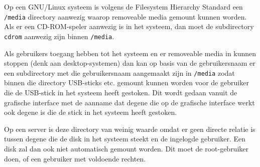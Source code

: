 Op een GNU/Linux systeem is volgens de Filesystem Hierarchy Standard een \texttt{/media} directory aanwezig waarop removeable media gemount kunnen worden. Als er een CD-ROM-speler aanwezig is in het systeem, dan moet de subdirectory \texttt{cdrom} aanwezig zijn binnen \texttt{/media}.

Als gebruikers toegang hebben tot het systeem en er removeable media in kunnen stoppen (denk aan desktop-systemen) dan kan op basis van de gebruikersnaam er een subdirectory met die gebruikersnaam aangemaakt zijn in \texttt{/media} zodat binnen die directory USB-sticks etc. gemount kunnen worden voor de gebruiker die de USB-stick in het systeem heeft gestoken. Dit wordt gedaan vanuit de grafische interface met de aanname dat degene die op de grafische interface werkt ook degene is die de stick in het systeem heeft gestoken.

Op een server is deze directory van weinig waarde omdat er geen directe relatie is tussen degene die de disk in het systeem steekt en de ingelogde gebruiker. Een disk zal dan ook niet automatisch gemount worden. Dit moet de root-gebruiker doen, of een gebruiker met voldoende rechten.

